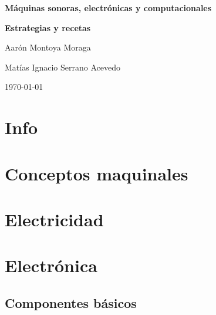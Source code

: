 \documentclass[10pt, openany]{book}
\begin{document}
\begin{titlepage}
	\centering
	\vspace{1cm}
	\vspace{1.5cm}
    \vfill
	{\huge\bfseries Máquinas sonoras, electrónicas y computacionales\par}
	{\large\bfseries Estrategias y recetas\par}
	\vspace{2cm}
	{\Large Aarón Montoya Moraga\par}
    {\Large Matías Ignacio Serrano Acevedo\par}
    \vfill
	{\large \today\par}
\end{titlepage}

\tableofcontents

\newpage

\part{Info}







\part{Conceptos maquinales}








\part{Electricidad}






\part{Electrónica}

\chapter{Componentes básicos}
\end{document}
